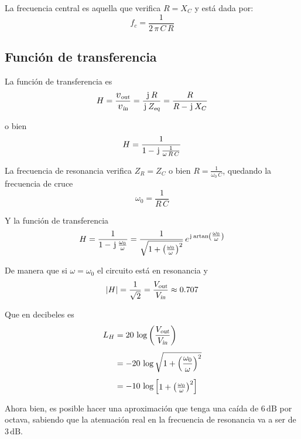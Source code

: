 La frecuencia central es aquella que verifica $R = X_C$ y está dada por:
\begin{equation*}
    f_c = \frac{1}{2 \, \pi \, C \, R}
\end{equation*}


\subsection{Función de transferencia}

La función de transferencia es
\begin{equation*}
    H = \frac{\sub{\voltage}{out}}{\sub{\voltage}{in}}
    = \frac{\iu \, R}{\iu \, \sub{Z}{eq}}
    = \frac{R}{R - \iu \, X_C}
\end{equation*}

o bien
\begin{equation*}
    H = \frac{1}{1 - \mkern2mu\mathrm{j}\mkern1mu \, \tfrac{1}{\omega \, R \, C}}
\end{equation*}

La frecuencia de resonancia verifica $Z_R = Z_C$ o bien $R = \frac{1}{\omega_0 \, C}$, quedando la frecuencia de cruce
\begin{equation*}
    \omega_0 = \frac{1}{R \, C}
\end{equation*}

Y la función de transferencia
\begin{equation*}
    H = \frac{1}{1 - \mkern2mu\mathrm{j}\mkern1mu \, \tfrac{\omega_0}{\omega}} = \frac{1}{\sqrt{1 +  \left(\tfrac{\omega_0}{\omega}\right)^2}} \, e^{\mkern2mu\mathrm{j}\mkern1mu \operatorname{artan} \left(\tfrac{\omega_0}{\omega}\right)}
\end{equation*}

De manera que si $\omega = \omega_0$ el circuito está en resonancia y
\begin{equation*}
    {\left| {H} \right|} = \frac{1}{\sqrt{2}} = \frac{{{V}_\textsl{{out}}}}{{{V}_\textsl{{in}}}} \approx 0.707
\end{equation*}

Que en decibeles es
\begin{align*}
    L_H &= 20 \, \log \left(\frac{{{V}_\textsl{{out}}}}{{{V}_\textsl{{in}}}}\right)
    \\[1ex]
    &= -20 \, \log \sqrt{1 + \left(\frac{\omega_0}{\omega}\right)^2}
    \\[1ex]
    &= -10 \, \log { \begin{bmatrix} 1 + \left(\frac{\omega_0}{\omega}\right)^2 \end{bmatrix} }
\end{align*}

Ahora bien, es posible hacer una aproximación que tenga una caída de $6 \, \si{\deci \bel}$ por octava, sabiendo que la atenuación real en la frecuencia de resonancia va a ser de $3 \, \si{\deci \bel}$.


